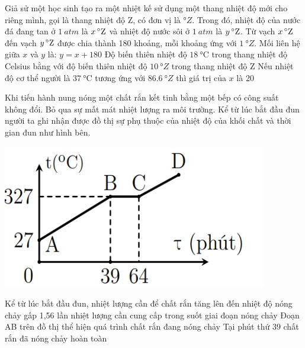 \begin{ex}
	Giả sử một học sinh tạo ra một nhiệt kế sử dụng một thang nhiệt độ mới cho riêng mình, gọi là thang nhiệt độ Z, có đơn vị là $\si{\degree Z}$. Trong đó, nhiệt độ của nước đá đang tan ở $\SI{1}{atm}$ là $\xsi{x}{\degree Z}$ và nhiệt độ nước sôi ở $\SI{1}{atm}$ là $\xsi{y}{\degree Z}$. Từ vạch $\xsi{x}{\degree Z}$ đến vạch $\xsi{y}{\degree Z}$ được chia thành 180 khoảng, mỗi khoảng ứng với $\SI{1}{\degree Z}$.
	{\True Mối liên hệ giữa $x$ và $y$ là: $y=x+180$}
	{Độ biến thiên nhiệt độ $\SI{18}{\celsius}$ trong thang nhiệt độ Celsius bằng với độ biến thiên nhiệt độ $\SI{10}{\degree Z}$ trong thang nhiệt độ Z}
	{\True Nếu nhiệt độ cơ thể người là $\SI{37}{\celsius}$ tương ứng với $\SI{86.6}{\degree Z}$ thì giá trị của $x$ là 20 }
\end{ex}
\begin{ex}
Khi tiến hành nung nóng một chất rắn kết tinh bằng một bếp có công suất không đổi. Bỏ qua sự mất mát nhiệt lượng ra môi trường. Kể từ lúc bắt đầu đun người ta ghi nhận được đồ thị sự phụ thuộc của nhiệt độ của khối chất và thời gian đun như hình bên.	
\begin{center}
	\includegraphics[width=0.3\linewidth]{../figs/D12-5-3}
\end{center}
	{\True Kể từ lúc bắt đầu đun, nhiệt lượng cần để chất rắn tăng lên đến nhiệt độ nóng chảy gấp 1,56 lần nhiệt lượng cần cung cấp trong suốt giai đoạn nóng chảy}
	{Đoạn AB trên đồ thị thể hiện quá trình chất rắn đang nóng chảy}
	{Tại phút thứ 39 chất rắn đã nóng chảy hoàn toàn}
	\loigiai{}
\end{ex}

